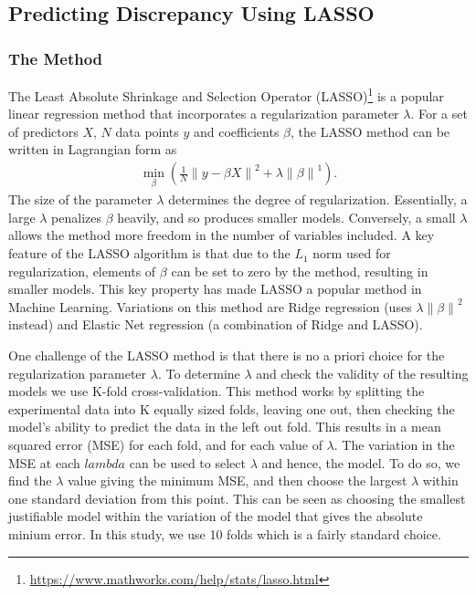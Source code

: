 \documentclass[11pt,a4paper,oneside]{article}
\newcommand{\norm}[1]{\left\lVert#1\right\rVert}
\begin{document}
\subsection{Predicting Discrepancy Using LASSO}\label{SubSec_Lasso_Discrepancy}

\subsubsection{The Method}
The Least Absolute Shrinkage and Selection Operator (LASSO)\footnote{\url{https://www.mathworks.com/help/stats/lasso.html}} is a popular linear regression method that incorporates a regularization parameter $\lambda$. For a set of predictors $X$, $N$ data points $y$ and coefficients $\beta$, the LASSO method can be written in Lagrangian form as
\begin{align}
	\min_{\beta} ( \frac{1}{N} \norm{ y - \beta X }^2 + \lambda \norm{ \beta }^1 ).
\end{align}
The size of the parameter $\lambda$ determines the degree of regularization. Essentially, a large $\lambda$ penalizes $\beta$ heavily, and so produces smaller models. Conversely, a small $\lambda$ allows the method more freedom in the number of variables included. A key feature of the LASSO algorithm is that due to the $L_1$ norm used for regularization, elements of $\beta$ can be set to zero by the method, resulting in smaller models. This key property has made LASSO a popular method in Machine Learning. Variations on this method are Ridge regression (uses $\lambda \norm{ \beta }^2$ instead) and Elastic Net regression (a combination of Ridge and LASSO).

One challenge of the LASSO method is that there is no a priori choice for the regularization parameter $\lambda$. To determine $\lambda$ and check the validity of the resulting models we use K-fold cross-validation. This method works by splitting the experimental data into K equally sized folds, leaving one out, then checking the model's ability to predict the data in the left out fold. This results in a mean squared error (MSE) for each fold, and for each value of $\lambda$. The variation in the MSE at each $lambda$ can be used to select $\lambda$ and hence, the model. To do so, we find the $\lambda$ value giving the minimum MSE, and then choose the largest $\lambda$ within one standard deviation from this point. This can be seen as choosing the smallest justifiable  model within the variation of the model that gives the absolute minium error. In this study, we use 10 folds which is a fairly standard choice.
\end{document}
